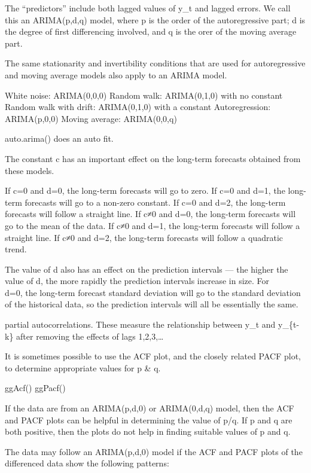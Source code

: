 \documentclass[]{book}
\begin{document}
The ``predictors'' include both lagged values of y\_t and lagged errors.
We call this an ARIMA(p,d,q) model, where p is the order of the
autoregressive part; d is the degree of first differencing involved, and
q is the orer of the moving average part.

The same stationarity and invertibility conditions that are used for
autoregressive and moving average models also apply to an ARIMA model.

White noise: ARIMA(0,0,0) Random walk: ARIMA(0,1,0) with no constant
Random walk with drift: ARIMA(0,1,0) with a constant Autoregression:
ARIMA(p,0,0) Moving average: ARIMA(0,0,q)

auto.arima() does an auto fit.

The constant c has an important effect on the long-term forecasts
obtained from these models.

If c=0 and d=0, the long-term forecasts will go to zero. If c=0 and d=1,
the long-term forecasts will go to a non-zero constant. If c=0 and d=2,
the long-term forecasts will follow a straight line. If c≠0 and d=0, the
long-term forecasts will go to the mean of the data. If c≠0 and d=1, the
long-term forecasts will follow a straight line. If c≠0 and d=2, the
long-term forecasts will follow a quadratic trend.

The value of d also has an effect on the prediction intervals --- the
higher the value of d, the more rapidly the prediction intervals
increase in size. For\\
d=0, the long-term forecast standard deviation will go to the standard
deviation of the historical data, so the prediction intervals will all
be essentially the same.

partial autocorrelations. These measure the relationship between y\_t
and y\_\{t-k\} after removing the effects of lags 1,2,3,\ldots{}

It is sometimes possible to use the ACF plot, and the closely related
PACF plot, to determine appropriate values for p \& q.

ggAcf() \textbar{} ggPacf()

If the data are from an ARIMA(p,d,0) or ARIMA(0,d,q) model, then the ACF
and PACF plots can be helpful in determining the value of p/q. If p and
q are both positive, then the plots do not help in finding suitable
values of p and q.

The data may follow an ARIMA(p,d,0) model if the ACF and PACF plots of
the differenced data show the following patterns:
\end{document}
